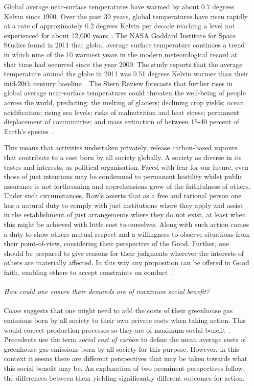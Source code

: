\documentclass[11pt, oneside]{article}   	%
\begin{document}
Global average near-surface temperatures have warmed by about 0.7 degrees Kelvin since 1900.
Over the past 30 years, global temperatures have risen rapidly at a rate of approximately 0.2 degrees Kelvin per decade reaching a level not experienced for about 12,000 years~\cite{hj1}.
The NASA Goddard Institute for Space Studies found in 2011 that global average surface temperature continues a trend in which nine of the 10 warmest years in the modern meteorological record at that time had occurred since the year 2000.
The study reports that the average temperature around the globe in 2011 was 0.51 degrees Kelvin warmer than their mid-20th century baseline~\cite{candm1}.
The Stern Review forecasts that further rises in global average near-surface temperatures could threaten the well-being of people across the world, predicting: the melting of glaciers; declining crop yields; ocean acidification; rising sea levels; risks of malnutrition and heat stress; permanent displacement of communities; and mass extinction of between 15-40 percent of Earth's species~\cite{ns1}.\

This means that activities undertaken privately, release carbon-based vapours that contribute to a cost born by all society globally.
A society as diverse in its tastes and interests, as political organisation.
Faced with fear for our future, even those of just intentions may be condemned to permanent hostility whilst public assurance is not forthcoming and apprehensions grow of the faithfulness of others.
Under such circumstances, Rawls asserts that as a free and rational person one has a natural duty to comply with just institutions where they apply and assist in the establishment of just arrangements where they do not exist, at least when this might be achieved with little cost to ourselves.
Along with such action comes a duty to show others mutual respect and a willingness to observe situations from their point-of-view, considering their perspective of the Good.
Further, one should be prepared to give reasons for their judgments wherever the interests of others are materially affected. In this way any proposition can be offered in Good faith, enabling others to accept constraints on conduct~\cite{jr1}.\\
\\
 \emph{How could one ensure their demands are of maximum social benefit?}\\
 \\
Coase suggests that one might need to add the costs of their greenhouse gas emissions born by all society to their own private costs when taking action.
This would correct production processes so they are of maximum social benefit~\cite{rc1}.
Precedents use the term \emph{social cost of carbon} to define the mean average costs of greenhouse gas emissions born by all society for this purpose.
However, in this context it seems there are different perspectives that may be taken towards what this social benefit may be.
An explanation of two prominent perspectives follow, the differences between them yielding significantly different outcomes for action.
\end{document}
